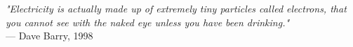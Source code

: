\begin{flushright}
\emph{"Electricity is actually made up of extremely tiny particles called electrons, that you cannot see with the naked eye unless you have been drinking."}\\
— Dave Barry, 1998
\end{flushright}